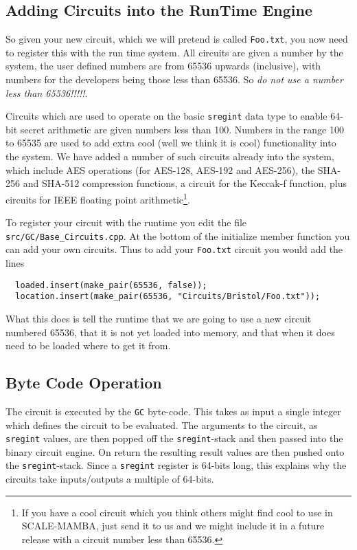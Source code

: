 \subsection{Adding Circuits into the RunTime Engine}
So given your new circuit, which we will pretend is
called \verb|Foo.txt|, you now need to register this
with the run time system.
All circuits are given a number by the system,
the user defined numbers are from 65536 upwards (inclusive),
with numbers for the developers being those less
than 65536.
So {\em do not use a number less than 65536!!!!!}.

Circuits which are used to operate on the basic \verb|sregint|
data type to enable 64-bit secret arithmetic are
given numbers less than 100.
Numbers in the range 100 to 65535 are used to add extra
cool (well we think it is cool) functionality into the
system.
We have added a number of such circuits already into the
system, which include AES operations (for AES-128, AES-192
and AES-256), the SHA-256 and SHA-512 compression functions,
a circuit for the Keccak-f function, plus circuits for
IEEE floating point arithmetic\footnote{If
you have a cool circuit which you think others might find
cool to use in SCALE-MAMBA, just send it to us and we
might include it in a future release with a circuit
number less than 65536.}.

To register your circuit with the runtime you edit the
file \verb|src/GC/Base_Circuits.cpp|. At the bottom of
the initialize member function you can add your
own circuits.
Thus to add your \verb|Foo.txt| circuit you would add
the lines
\begin{lstlisting}
  loaded.insert(make_pair(65536, false));
  location.insert(make_pair(65536, "Circuits/Bristol/Foo.txt"));
\end{lstlisting}
What this does is tell the runtime that we are going to
use a new circuit numbered 65536, that it is not yet loaded
into memory, and that when it does need to be loaded
where to get it from.

\subsection{Byte Code Operation}
The circuit is executed by the \verb|GC| byte-code.
This takes as input a single integer which defines the
circuit to be evaluated.
The arguments to the circuit, as \verb|sregint| values,
are then popped off the \verb|sregint|-stack and then passed
into the binary circuit engine.
On return the resulting result values are then pushed
onto the \verb|sregint|-stack.
Since a \verb|sregint| register is 64-bits long, this
explains why the circuits take inputs/outputs a multiple
of 64-bits.

